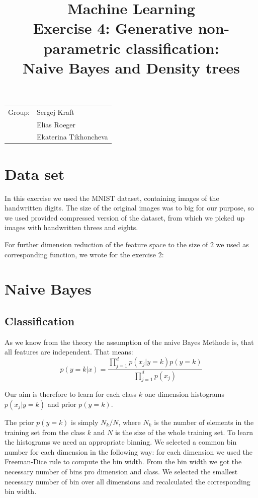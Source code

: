 \documentclass{article}
\title{Machine Learning \\ \bf{Exercise 4: Generative non-parametric classification:\\
								Naive Bayes and Density trees} } %
\begin{document}
\maketitle

\begin{center}
\begin{tabular}{l l}
Group: &  Sergej Kraft \\
       & Elias Roeger \\
       & Ekaterina Tikhoncheva \\ 
\end{tabular}
\end{center}

\tableofcontents

\section{Data set}

In this exercise we used the MNIST dataset, containing images of the handwritten digits. The size of the original images was to big for our purpose, so we used provided compressed version of the dataset, from which we picked up images with handwritten threes and eights.

For further dimension reduction of the feature space to the size of $2$ we used as corresponding function, we wrote for the exercise $2$: 



\FloatBarrier

\section{Naive Bayes}

\subsection{Classification}

As we know from the theory the assumption of the naive Bayes Methode is, that all features are independent. That means:
$$p(y=k|x)=\frac{\prod_{j=1}^d p(x_j|y=k) p(y=k)}{\prod_{j=1}^d p(x_j)}$$

Our aim is therefore to learn for each class $k$ one dimension histograms $p(x_j|y=k)$ and prior $p(y=k)$.

The prior $p(y=k)$ is simply $N_k/N$, where $N_k$ is the number of elements in the training set from the class $k$ and $N$ is the size of the whole training set.
To learn the histograms we need an appropriate binning. We selected a common bin number for each dimension in the following way: for each dimension we used the Freeman-Dice rule to compute the bin width. From the bin width we got the necessary number of bins pro dimension and class. We selected the smallest necessary number of bin over all dimensions and recalculated the corresponding bin width.
\end{document}
